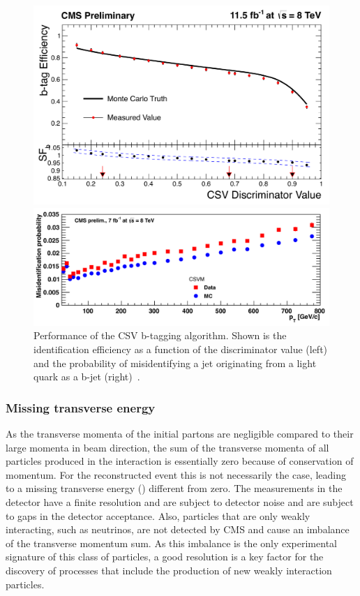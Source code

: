 \begin{figure}[htbp]
\centering
\begin{minipage}[t]{0.49\textwidth}
  \includegraphics[width=\textwidth]{plots/RECO/bTagEfficiency.png}
\end{minipage}
\begin{minipage}[t]{0.49\textwidth}
\includegraphics[width=\textwidth]{plots/RECO/bTagMisID.png}
\end{minipage}
\caption{Performance of the CSV b-tagging algorithm. Shown is the identification efficiency as a function of the discriminator value (left) and the probability of misidentifying a jet originating from a light quark as a b-jet (right)~\cite{CMS-DP-2013-005}.}
\label{fig:bTagging}
\end{figure} 

\subsubsection{Missing transverse energy}
As the transverse momenta of the initial partons are negligible compared to their large momenta in beam direction, the sum of the transverse momenta of all particles produced in the interaction is essentially zero because of conservation of momentum. For the reconstructed event this is not necessarily the case, leading to a missing transverse energy (\MET) different from zero. The measurements in the detector have a finite resolution and are subject to detector noise and are subject to gaps in the detector acceptance. Also, particles that are only weakly interacting, such as neutrinos, are not detected by CMS and cause an imbalance of the transverse momentum sum. As this imbalance is the only experimental signature of this class of particles, a good \MET resolution is a key factor for the discovery of processes that include the production of new weakly interaction particles. 

